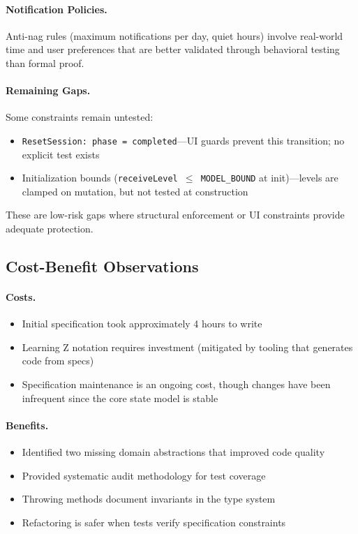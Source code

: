 \documentclass[a4paper,10pt,fleqn]{article}
\begin{document}
\paragraph{Notification Policies.}
Anti-nag rules (maximum notifications per day, quiet hours) involve real-world
time and user preferences that are better validated through behavioral testing
than formal proof.

\paragraph{Remaining Gaps.}
Some constraints remain untested:

\begin{itemize}
\item \texttt{ResetSession: phase = completed}---UI guards prevent this
      transition; no explicit test exists
\item Initialization bounds (\texttt{receiveLevel $\leq$ MODEL\_BOUND} at
      init)---levels are clamped on mutation, but not tested at construction
\end{itemize}

These are low-risk gaps where structural enforcement or UI constraints
provide adequate protection.

\subsection{Cost-Benefit Observations}

\paragraph{Costs.}
\begin{itemize}
\item Initial specification took approximately 4 hours to write
\item Learning Z notation requires investment (mitigated by tooling that
      generates code from specs)
\item Specification maintenance is an ongoing cost, though changes have
      been infrequent since the core state model is stable
\end{itemize}

\paragraph{Benefits.}
\begin{itemize}
\item Identified two missing domain abstractions that improved code quality
\item Provided systematic audit methodology for test coverage
\item Throwing methods document invariants in the type system
\item Refactoring is safer when tests verify specification constraints
\end{itemize}
\end{document}
